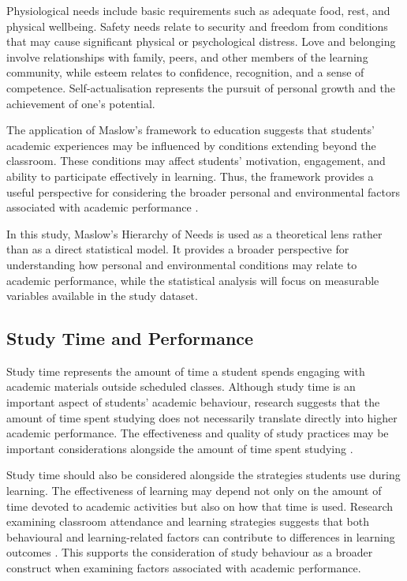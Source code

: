 Physiological needs include basic requirements such as adequate food, rest, and physical wellbeing. Safety needs relate to security and freedom from conditions that may cause significant physical or psychological distress. Love and belonging involve relationships with family, peers, and other members of the learning community, while esteem relates to confidence, recognition, and a sense of competence. Self-actualisation represents the pursuit of personal growth and the achievement of one's potential.

The application of Maslow's framework to education suggests that students' academic experiences may be influenced by conditions extending beyond the classroom. These conditions may affect students' motivation, engagement, and ability to participate effectively in learning. Thus, the framework provides a useful perspective for considering the broader personal and environmental factors associated with academic performance \citep{freitas2011maslow}.

In this study, Maslow's Hierarchy of Needs is used as a theoretical lens rather than as a direct statistical model. It provides a broader perspective for understanding how personal and environmental conditions may relate to academic performance, while the statistical analysis will focus on measurable variables available in the study dataset.

\subsection{Study Time and Performance}

Study time represents the amount of time a student spends engaging with academic materials outside scheduled classes. Although study time is an important aspect of students' academic behaviour, research suggests that the amount of time spent studying does not necessarily translate directly into higher academic performance. The effectiveness and quality of study practices may be important considerations alongside the amount of time spent studying \citep{plant2005study}.

Study time should also be considered alongside the strategies students use during learning. The effectiveness of learning may depend not only on the amount of time devoted to academic activities but also on how that time is used. Research examining classroom attendance and learning strategies suggests that both behavioural and learning-related factors can contribute to differences in learning outcomes \citep{tetteh2018attendance}. This supports the consideration of study behaviour as a broader construct when examining factors associated with academic performance.

